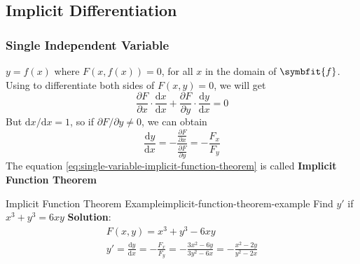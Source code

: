 \documentclass[math,code]{amznotes}
\theoremstyle{remark}
\begin{document}
\subsection{Implicit Differentiation}
\subsubsection{Single Independent Variable}
$y=f(x)$ where $F(x,f(x))=0$, for all $x$ in the domain of $\symbfit{f}$. Using  to differentiate both sides of $F(x,y)=0$, we will get
\begin{displaymath}
    \frac{\partial F}{\partial x} \cdot \frac{\mathrm d x}{\mathrm d x} + \frac{\partial F}{\partial y} \cdot \frac{\mathrm d y}{\mathrm d x} = 0
\end{displaymath}
But $\mathrm d x/\mathrm d x = 1$, so if $\partial F / \partial y \neq 0$, we can obtain
\begin{equation} \label{eq:single-variable-implicit-function-theorem}
    \frac{\mathrm d y}{\mathrm d x} = - \frac{\frac{\partial F}{\partial x}}{\frac{\partial F}{\partial y}} = -\frac{F_x}{F_y}
\end{equation}
The equation \eqref{eq:single-variable-implicit-function-theorem} is called {\color{red} \textbf{Implicit Function Theorem}}
\begin{exbox}{Implicit Function Theorem Example}{implicit-function-theorem-example}
    Find $y'$ if $x^3+y^3=6xy$ \newline
    {\color{blue} \textbf{Solution}}:
    \begin{gather*}
        F(x,y)=x^3+y^3-6xy \\
        y'=\frac{\mathrm d y}{\mathrm d x}=-\frac{F_x}{F_y}=-\frac{3x^2-6y}{3y^2-6x}=-\frac{x^2-2y}{y^2-2x}
    \end{gather*}
\end{exbox}
\end{document}
